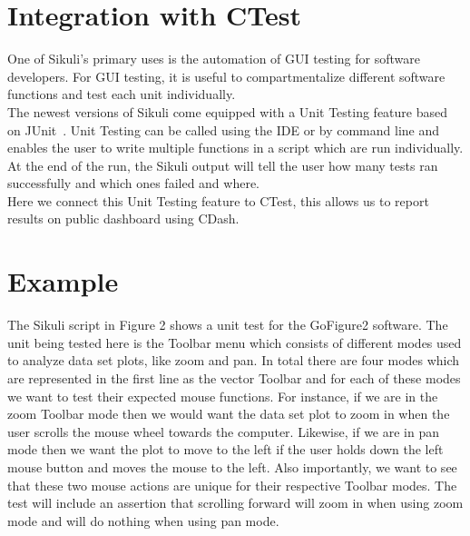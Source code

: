 \documentclass{InsightArticle}
\begin{document}
\section{Integration with CTest}

One of Sikuli's primary uses is the automation of GUI testing for software
developers. For GUI testing, it is useful to compartmentalize different software
functions and test each unit individually.\\

The newest versions of Sikuli come equipped with a Unit Testing feature based
on JUnit~\cite{}. Unit Testing can be called using the IDE or by command
line and enables the user to write multiple functions in a script which are
run individually. At the end of the run, the Sikuli output will tell the user
how many tests ran successfully and which ones failed and where.\\

Here we connect this Unit Testing feature to CTest, this allows us to report
results on public dashboard using CDash.


\section{Example}

The Sikuli script in Figure 2 shows a unit test for the GoFigure2 software.  The unit being tested here
is the Toolbar menu which consists of different modes used to analyze data set plots, like zoom and pan.
In total there are four modes which are represented in the first line as the vector Toolbar and for each
of these modes we want to test their expected mouse functions.  For instance, if we are in the zoom Toolbar mode
then we would want the data set plot to zoom in when the user scrolls the mouse wheel towards the computer.  Likewise,
if we are in pan mode then we want the plot to move to the left if the user holds down the left mouse button and moves
the mouse to the left.  Also importantly, we want to see that these two mouse actions are unique for their respective Toolbar modes.
The test will include an assertion that scrolling forward will zoom in when using zoom mode and will do nothing when using pan mode.\\
\end{document}

